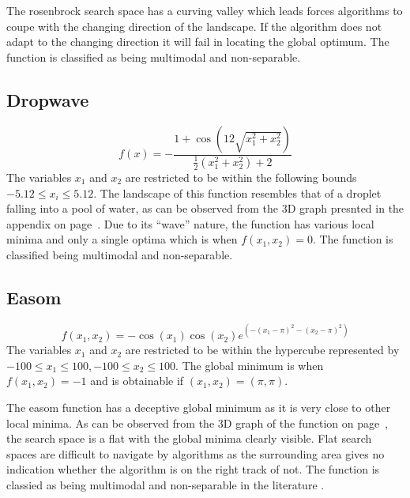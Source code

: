 The rosenbrock search space has a curving valley which leads forces algorithms to coupe with the changing direction of the landscape\cite{numericalABC,ABCCompareStudy,ChaoticABC,PerfABC,HybridIntelliGA}. If the algorithm does not adapt to the changing direction it will fail in locating the global optimum. The function is classified as being multimodal and non-separable\cite{numericalABC,ABCCompareStudy,ChaoticABC,PerfABC,HybridIntelliGA}.
\subsection{Dropwave}
\begin{equation}
	f(x) = -\frac{1 + \cos{(12\sqrt{x_1^2 + x_2^2})}}{\frac{1}{2}(x_1^2 + x_2^2) + 2}
\end{equation}
The variables $x_1$ and $x_2$ are restricted to be within the following bounds $-5.12 \leq x_i \leq 5.12$\cite{TestFunctions}. The landscape of this function resembles that of a droplet falling into a pool of water, as can be observed from the 3D graph presnted in the appendix on page~\pageref{fig:DropwaveGraph}. Due to its ``wave'' nature, the function has various local minima and only a single optima which is when $f(x_1,x_2) = 0$. The function is classified being multimodal and non-separable\cite{TestFunctions}.
\subsection{Easom}
\begin{equation}
	f(x_1,x_2) = -\cos(x_1)\cos(x_2)e^{(-(x_1 - \pi)^2 - (x_2 - \pi)^2)}
\end{equation}
The variables $x_1$ and $x_2$ are restricted to be within the hypercube represented by $-100 \leq x_1 \leq 100, -100 \leq x_2 \leq 100$\cite{TSGlobalOptContinFunc,ContinACSTS,TestFunctions}. The global minimum is when $f(x_1,x_2) = -1$ and is obtainable if $(x_1,x_2) = (\pi,\pi)$\cite{TSGlobalOptContinFunc,ContinACSTS,TestFunctions}. 

The easom function has a deceptive global minimum as it is very close to other local minima\cite{ABCCompareStudy,TSGlobalOptimization}. As can be observed from the 3D graph of the function on page~\pageref{fig:EasomGraph}, the search space is a flat with the global minima clearly visible. Flat search spaces are difficult to navigate by algorithms as the surrounding area gives no indication whether the algorithm is on the right track of not. The function is classied as being multimodal and non-separable in the literature \cite{ABCCompareStudy,TSGlobalOptimization,TSGlobalOptContinFunc}.
